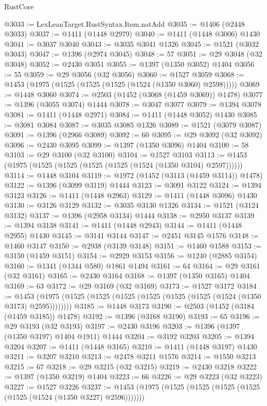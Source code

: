 \begin{lexlean}{RustCore}
\begin{coremodule}
{\begin{coremodule}
{{{{{{{{{{{{{{{{{{{{{{{{{{{{{{{{{{{{{{{{{{{{{@3033 := LexLeanTarget.RustSyntax.Item.natAdd
@3035 := @1406 (@2448 @3033)
@3037 := @1411 (@1448 @2979)
@3040 := @1411 (@1448 @3006) @1430
@3041 := @3037 @3040
@3043 := @3035 @3041 @1326
@3045 := @1521 (@3032 @3043)
@3047 := @1396 (@2974 @3045)
@3048 := 57
@3051 := @29 @3048 (@32 @3048)
@3052 := @2430 @3051
@3055 := @1397 (@1350 @3052) @1404
@3056 := 55
@3059 := @29 @3056 (@32 @3056)
@3060 := @1527 @3059
@3068 := @1453 (@1975 (@1525 (@1525 (@1525 (@1524 (@1350 @3060) @2598)))))
@3069 := @1448 @3060
@3074 := @2503 (@1452 (@3068 (@1459 @3069)) @1478)
@3077 := @1396 (@3055 @3074) @1444
@3078 := @3047 @3077
@3079 := @1394 @3078
@3081 := @1411 (@1448 @2971)
@3084 := @1411 (@1448 @3052) @1430
@3085 := @3081 @3084
@3087 := @3035 @3085 @1326
@3089 := @1521 (@3079 @3087)
@3091 := @1396 (@2966 @3089)
@3092 := 60
@3095 := @29 @3092 (@32 @3092)
@3096 := @2430 @3095
@3099 := @1397 (@1350 @3096) @1404
@3100 := 58
@3103 := @29 @3100 (@32 @3100)
@3104 := @1527 @3103
@3113 := @1453 (@1975 (@1525 (@1525 (@1525 (@1525 (@1524 (@1350 @3104) @2597))))))
@3114 := @1448 @3104
@3119 := @1972 (@1452 (@3113 (@1459 @3114)) @1478)
@3122 := @1396 (@3099 @3119) @1444
@3123 := @3091 @3122
@3124 := @1394 @3123
@3126 := @1411 (@1448 @2963)
@3129 := @1411 (@1448 @3096) @1430
@3130 := @3126 @3129
@3132 := @3035 @3130 @1326
@3134 := @1521 (@3124 @3132)
@3137 := @1396 (@2958 @3134) @1444
@3138 := @2950 @3137
@3139 := @1394 @3138
@3141 := @1411 (@1448 @2943)
@3144 := @1411 (@1448 @2955) @1430
@3145 := @3141 @3144
@3147 := @2451 @3145 @1576
@3148 := @1460 @3147
@3150 := @2938 (@3139 @3148)
@3151 := @1460 @1588
@3153 := @3150 (@1459 @3151)
@3154 := @2929 @3153
@3156 := @1240 (@2885 @3154)
@3160 := @1341 (@1344 @580) @1861 @1494
@3161 := 64
@3164 := @29 @3161 (@32 @3161)
@3165 := @2430 @3164
@3168 := @1397 (@1350 @3165) @1404
@3169 := 63
@3172 := @29 @3169 (@32 @3169)
@3173 := @1527 @3172
@3184 := @1453 (@1975 (@1525 (@1525 (@1525 (@1525 (@1525 (@1525 (@1524 (@1350 @3173) @2595))))))))
@3185 := @1448 @3173
@3190 := @2503 (@1452 (@3184 (@1459 @3185)) @1478)
@3192 := @1396 (@3168 @3190)
@3193 := 65
@3196 := @29 @3193 (@32 @3193)
@3197 := @2430 @3196
@3203 := @1396 (@1397 (@1350 @3197) @1404 @1911) @1444
@3204 := @3192 @3203
@3205 := @1394 @3204
@3207 := @1411 (@1448 @3165)
@3210 := @1411 (@1448 @3197) @1430
@3211 := @3207 @3210
@3213 := @2478 @3211 @1576
@3214 := @1550 @3213
@3215 := 67
@3218 := @29 @3215 (@32 @3215)
@3219 := @2430 @3218
@3222 := @1397 (@1350 @3219) @1404
@3223 := 66
@3226 := @29 @3223 (@32 @3223)
@3227 := @1527 @3226
@3237 := @1453 (@1975 (@1525 (@1525 (@1525 (@1525 (@1525 (@1524 (@1350 @3227) @2596)))))))
}}}}}}}}}}}}}}}}}}}}}}}}}}}}}}}}}}}}}}}}}}}}}
\end{coremodule}}
\end{coremodule}
\end{lexlean}
